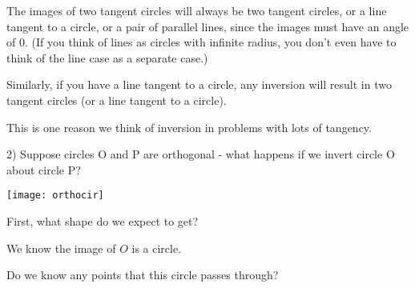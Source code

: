


The images of two tangent circles will always be two tangent circles, or a line tangent to a circle, or a pair of parallel lines, since the images must have an angle of 0.  (If you think of lines as circles with infinite radius, you don't even have to think of the line case as a separate case.)

Similarly, if you have a line tangent to a circle, any inversion will result in two tangent circles (or a line tangent to a circle).

This is one reason we think of inversion in problems with lots of tangency.

2) Suppose circles O and P are orthogonal - what happens if we invert circle O about circle P?

\begin{center}
    \texttt{[image: orthocir]}    
\end{center}

First, what shape do we expect to get?






We know the image of $O$ is a circle.

Do we know any points that this circle passes through?

